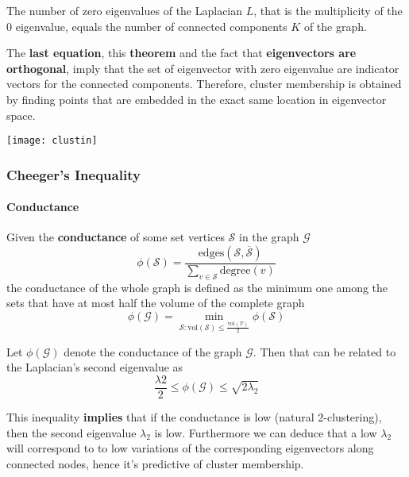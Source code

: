\begin{theorem}
	The number of zero eigenvalues of the Laplacian $L$, that is the multiplicity of the $0$ eigenvalue, equals the number of connected components $K$ of the graph.
\end{theorem}

The \textbf{last equation}, this \textbf{theorem} and the fact that \textbf{eigenvectors are orthogonal}, imply that the set of eigenvector with zero eigenvalue are indicator vectors for the connected components. Therefore, cluster membership is obtained by finding points that are embedded in the exact same location in eigenvector space.

\begin{center}
	\texttt{[image: clustin]}
\end{center}

\subsubsection{Cheeger's Inequality}
\paragraph{Conductance}
Given the \textbf{conductance} of some set vertices $\mathcal{S}$ in the graph $\mathcal{G}$
\begin{equation}
	\phi(\mathcal{S}) = \frac{\text{edges}(\mathcal{S}, \overline{\mathcal{S}})}{\sum_{v \in \mathcal{S}}\text{degree}(v)}
\end{equation}
the conductance of the whole graph is defined as the minimum one among the sets that have at most half the volume of the complete graph
\begin{equation}
	\phi(\mathcal{G}) = \min_{\mathcal{S}:\text{vol}(\mathcal{S}) \leq \frac{\text{vol}(\mathcal{V})}{2}}\phi(\mathcal{S})
\end{equation}

\begin{definition}
	Let $\phi(\mathcal{G})$ denote the conductance of the graph $\mathcal{G}$. Then that can be related to the Laplacian's second eigenvalue as
	\begin{equation}
		\frac{\lambda2}{2} \leq \phi(\mathcal{G}) \leq \sqrt{2 \lambda_2}
	\end{equation}
\end{definition}

This inequality \textbf{implies} that if the conductance is low (natural 2-clustering), then the second eigenvalue $\lambda_2$ is low. Furthermore we can deduce that a low $\lambda_2$ will correspond to to low variations of the corresponding eigenvectors along connected nodes, hence it's predictive of cluster membership.

